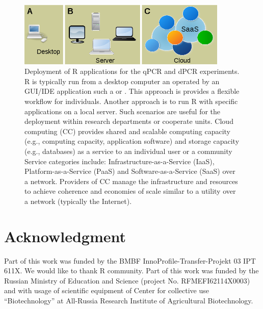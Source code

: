 \begin{figure}[htbp]
  \centering
  \includegraphics[clip=true, width=10cm]{figures/options.png}
  \caption{Deployment of R applications for the qPCR and dPCR experiments. 
 R is typically run from a desktop computer an operated by an 
GUI/IDE application such a  or . This approach is 
provides a flexible workflow for individuals.  Another approach is 
to run R with specific applications on a local server. Such scenarios are useful 
for the deployment within research departments or cooperate units.  
Cloud computing (CC) provides shared and scalable computing capacity (e.g., 
computing capacity, application software) and storage capacity (e.g., databases) 
as a service to an individual user or a community Service categories include: 
Infrastructure-as-a-Service (IaaS), Platform-as-a-Service (PaaS) and 
Software-as-a-Service (SaaS) over a network. Providers of CC manage the 
infrastructure and resources to achieve coherence and economies of scale similar 
to a utility over a network (typically the Internet).}
  \label{figure:options}
\end{figure} 

\section{Acknowledgment}

Part of this work was funded by the BMBF InnoProfile-Transfer-Projekt 03 IPT 
611X. We would like to thank R community. Part of this work was funded by the Russian Ministry of 
Education and Science (project No. RFMEFI62114X0003) and with usage of scientific equipment of 
Center for collective use ``Biotechnology'' at All-Russia Research Institute of Agricultural Biotechnology.



\address{Stefan R\"odiger (corresponding author)\\
  Faculty of Natural Sciences\\
  Brandenburg University of Technology Cottbus--Senftenberg\\
  Senftenberg\\
  Germany}

